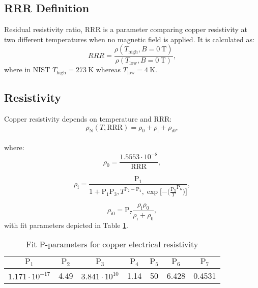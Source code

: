 
\subsection{RRR Definition}
\label{appendix:subsection_rrr_definition}
Residual resistivity ratio, RRR is a parameter comparing copper resistivity at two different temperatures when no magnetic field is applied. It is calculated as: 
\begin{equation}
RRR = \frac{\rho(T_\text{high}, B=0~\text{T})}{\rho(T_\text{low}, B=0~\text{T})},
\end{equation}
where in NIST $T_\text{high}=273~\text{K}$ whereas $T_\text{low}=4~\text{K}$.

\subsection{Resistivity}
Copper resistivity depends on temperature and RRR:
\begin{equation}
    \rho_\text{N}(T, \text{RRR}) = \rho_\text{0}+\rho_\text{i}+\rho_\text{i0},
\end{equation}
\\
where:
\begin{equation}
    \rho_\text{0} = \frac{1.5553\cdot10^{-8}}{\text{RRR}},
\end{equation}

\begin{equation}
    \rho_\text{i} = \frac{\text{P}_\text{1}}{1+\text{P}_\text{1}  \text{P}_\text{3}, T^{\text{P}_\text{2} - \text{P}_\text{4}}, \exp{[-(\frac{\text{P}_\text{5}}{T}}^{\text{P}_\text{6}})]},
\end{equation}

\begin{equation}
    \rho_\text{i0} = \text{P}_\text{7} \frac{\rho_\text{i} \rho_\text{0}}{\rho_\text{i} + \rho_\text{0}},
\end{equation}
with fit parameters depicted in Table \ref{table:nist_resistivity_parameters}. 

\begin{table}[H]
    \caption{Fit P-parameters for copper electrical resistivity} 
    \vspace{-1.em} 
    \fontsize{10}{10}
    \selectfont 
    \renewcommand{\arraystretch}{1.5}
    \begin{center}
    \begin{tabular}{ ccccccc }  
    \hline
    $\text{P}_1$ & $\text{P}_2$ & $\text{P}_3$ & $\text{P}_4$ & $\text{P}_5$ & $\text{P}_6$ & $\text{P}_7$ \\
    \hline
    $1.171\cdot10^{-17}$ & 4.49 & $3.841\cdot10^{10}$ & 1.14 & 50 & 6.428 & 0.4531 \\
    \hline 
    \end{tabular}
    \end{center}  
     \label{table:nist_resistivity_parameters} 
 \end{table}
 
